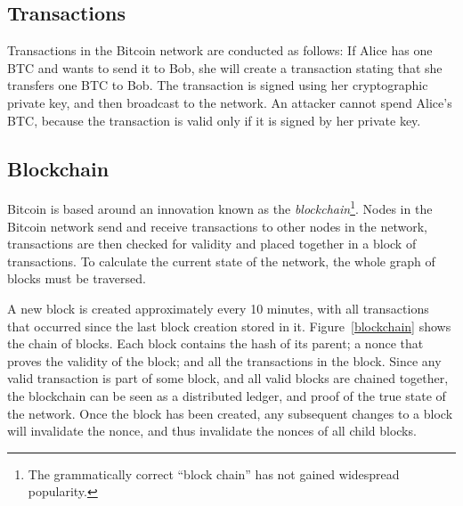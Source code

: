 \subsection{Transactions}
Transactions in the Bitcoin network are conducted as follows: If Alice has one BTC and wants to send it to Bob, she will create a transaction stating that she transfers one BTC to Bob. The transaction is signed using her cryptographic private key, and then broadcast to the network. An attacker cannot spend Alice's BTC, because the transaction is valid only if it is signed by her private key.

\subsection{Blockchain}
Bitcoin is based around an innovation known as the \emph{blockchain}\footnote{The grammatically correct ``block chain'' has not gained widespread popularity.}. Nodes in the Bitcoin network send and receive transactions to other nodes in the network, transactions are then checked for validity and placed together in a block of transactions. To calculate the current state of the network, the whole graph of blocks must be traversed.

A new block is created approximately every 10 minutes, with all transactions that occurred since the last block creation stored in it. Figure~\ref{blockchain} shows the chain of blocks. Each block contains the hash of its parent; a nonce that proves the validity of the block; and all the transactions in the block. Since any valid transaction is part of some block, and all valid blocks are chained together, the blockchain can be seen as a distributed ledger, and proof of the true state of the network. Once the block has been created, any subsequent changes to a block will invalidate the nonce, and thus invalidate the nonces of all child blocks.

